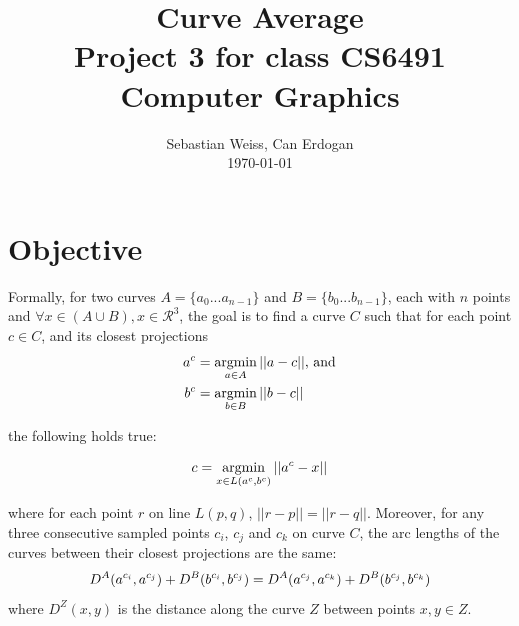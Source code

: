 \documentclass[journal, letterpaper]{IEEEtran}
\begin{document}
\title{Curve Average \\
	{\large Project 3 for class CS6491 Computer Graphics}}
\author{Sebastian Weiss, Can Erdogan \\ \today}

\maketitle


\section{Objective}
Formally, for two curves $A = \{a_0 ... a_{n-1}\}$ and $B = \{b_0 ... b_{n-1}\}$, each with $n$ points and $\forall x \in (A \cup B), x \in \mathcal{R}^3$,
the goal is to find a curve $C$ such that for each point $c \in C$, and its closest projections
\begin{align}
a^c &= \operatornamewithlimits{argmin}\limits_{a \in A} ||a-c|| \text{, and} \\
b^c &= \operatornamewithlimits{argmin}\limits_{b \in B} ||b-c||
\end{align}

\noindent the following holds true:

\begin{equation}
 c = \operatornamewithlimits{argmin}\limits_{x \in L(a^c, b^c)} ||a^c-x||
\end{equation}

\noindent where for each point $r$ on line $L(p,q)$, $||r-p|| = ||r-q||$. Moreover, for
any three consecutive sampled points $c_i$, $c_j$ and $c_k$ on curve $C$, the arc lengths
of the curves between their closest projections are the same:
\begin{equation}
\small
 D^A(a^{c_i},a^{c_j}) + D^B(b^{c_i},b^{c_j}) = D^A(a^{c_j},a^{c_k}) + D^B(b^{c_j},b^{c_k})
\end{equation}
\noindent where $D^Z(x,y)$ is the distance along the curve $Z$ between points $x,y \in Z$.
\end{document}
